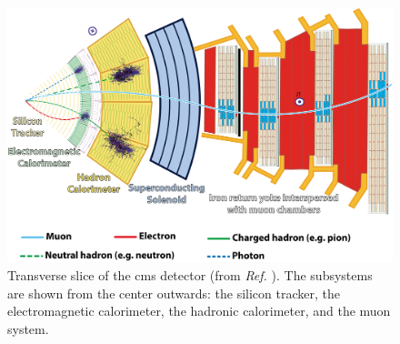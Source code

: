 \begin{figure}[h]
	\centering
	\includegraphics[width=\textwidth]{images/assets/cms_slice.png}
	\caption[Tranverse slice of CMS detector]{Transverse slice of the \acrshort{cms} detector (from \textit{Ref.} \cite{Barney:2120661}). The subsystems are shown from the center outwards: the silicon tracker, the electromagnetic calorimeter, the hadronic calorimeter, and the muon system.}
	\label{fig:cms_slice}
\end{figure}


